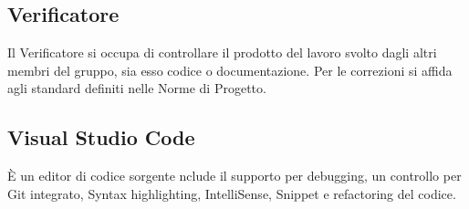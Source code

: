 \section{}
\subsection*{Verificatore} Il Verificatore si occupa di controllare il prodotto del lavoro svolto dagli altri membri del gruppo, sia esso codice o documentazione. Per le correzioni si affida agli standard definiti nelle Norme di Progetto.

\subsection*{Visual Studio Code} È un editor di codice sorgente nclude il supporto per debugging, un controllo per Git integrato, Syntax highlighting, IntelliSense, Snippet e refactoring del codice.
